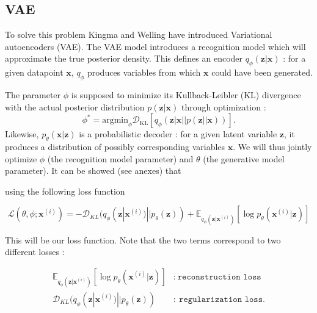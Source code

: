 \documentclass{article}
\begin{document}
\subsection{VAE}




To solve this problem Kingma and Welling \cite{kingmaAutoEncodingVariationalBayes2022} have introduced Variational autoencoders (VAE). The VAE model introduces a recognition model which will approximate the true posterior density. This defines an encoder $q_\phi(\textbf{z} | \textbf{x})$ : for a given datapoint $\textbf{x}$, $q_\phi$ produces variables from which $\textbf{x}$ could have been generated. 

The parameter $\phi$ is supposed to minimize its Kullback-Leibler (KL) divergence with the actual posterior distribution $p(\textbf{z}|\textbf{x})$ through optimization :
\begin{equation}
    \phi^* = \text{argmin}_{\phi} \mathcal{D}_{\text{KL}}[q_\phi(\textbf{z}|\textbf{x}||p(\textbf{z}||\textbf{x}))].
\end{equation}
Likewise, $p_\theta(\textbf{x}|\textbf{z})$ is a probabilistic decoder : for a given latent variable $\textbf{z}$, it produces a distribution of possibly corresponding variables $\textbf{x}$. We will thus jointly optimize $\phi$ (the recognition model parameter) and $\theta$ (the generative model parameter). It can be showed (see anexes) that 



using the following loss function 


\begin{equation}\label{loss1}
    \mathcal{L}(\theta, \phi ; \textbf{x}^{(i)}) = -\mathcal{D}_{KL}(q_\phi(\textbf{z} | \textbf{x}^{(i)}) || p_\theta(\textbf{z})) + \mathbb{E}_{q_\phi(\textbf{z} | \textbf{x}^{(i)})} [\log p_\theta(\textbf{x}^{(i)} | \textbf{z})]
\end{equation}


This will be our loss function. Note that the two terms correspond to two different losses :

\begin{align*}
    \mathbb{E}_{q_\phi(\textbf{z} | \textbf{x}^{(i)})} [\log p_\theta(\textbf{x}^{(i)} | \textbf{z})] &:\ \texttt{reconstruction loss} \\
    \mathcal{D}_{KL}(q_\phi(\textbf{z} | \textbf{x}^{(i)}) || p_\theta(\textbf{z})) &:\ \texttt{regularization loss}.
\end{align*}
\end{document}
